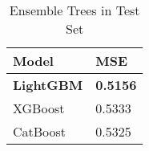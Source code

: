  \begin{table}[ht]
	\caption{Ensemble Trees in Test Set}
	\label{tab:my-table} 
	\centering \vspace{1em}
	\begin{tabular}{ll}
		\hline
		Model    & MSE    \\
		\hline
		\textbf{LightGBM} & \textbf{0.5156} \\
		XGBoost  & 0.5333 \\
		CatBoost & 0.5325 \\ 
		\hline
	\end{tabular}
\end{table}